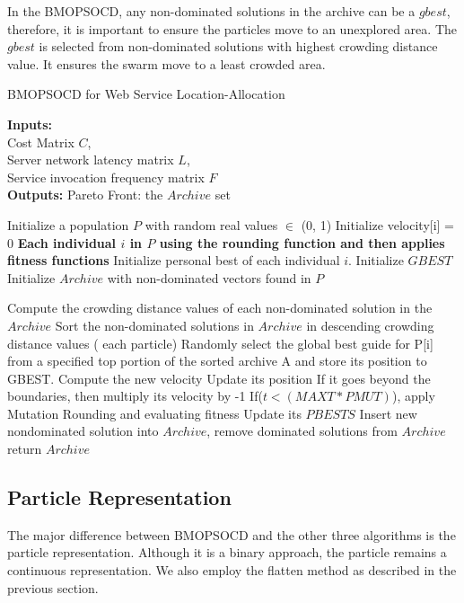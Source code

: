 In the BMOPSOCD, any non-dominated solutions in the archive can be a $gbest$, therefore, it is important to ensure the particles move to an unexplored area. The $gbest$ is selected from non-dominated solutions with highest crowding distance value. It ensures the swarm move to a least crowded area.

\begin{algorithm}[!htb]
	\caption{BMOPSOCD for Web Service Location-Allocation}
	\footnotesize
	\textbf{Inputs:} \\
		Cost Matrix $C$, \\
		Server network latency matrix $L$, \\
		Service invocation frequency matrix $F$ \\
	\textbf{Outputs:}
		Pareto Front: the $Archive$ set

	\begin{algorithmic}[1]
		\State Initialize a population $P$ with random real values $\in$ (0, 1)
		\State Initialize velocity[i] = 0
		\State \textbf{Each individual $i$ in $P$ using the rounding function and then applies fitness functions}
		\State Initialize personal best of each individual $i$.
		\State Initialize $GBEST$
		\State Initialize $Archive$ with non-dominated vectors found in $P$

		\Repeat
			\State Compute the crowding distance values of each non-dominated solution in the $Archive$
			\State Sort the non-dominated solutions in $Archive$ in descending crowding distance values
			\For ( each particle)
				\State Randomly select the global best guide for P[i] from a specified top portion of the sorted archive A and store its position to GBEST.
				\State Compute the new velocity 
				\State Update its position
				\State If it goes beyond the boundaries, then multiply its velocity by -1
				\State If($t < (MAXT * PMUT)$), apply Mutation
				\State Rounding and evaluating fitness
				\State Update its $PBESTS$
				\EndFor
		\State Insert new nondominated solution into $Archive$, remove dominated solutions from $Archive$
		\State return $Archive$
	\end{algorithmic}
	\label{alg:BMOPSOCD}
\end{algorithm}

\subsection{Particle Representation}
The major difference between BMOPSOCD and the other three algorithms is the particle representation. 
Although it is a binary approach, the particle remains a continuous representation.
We also employ the flatten method as described in the previous section.

